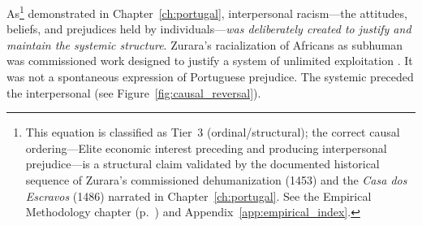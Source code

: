 As\footnote{This equation is classified as Tier~3 (ordinal/structural); the correct causal ordering---Elite economic interest preceding and producing interpersonal prejudice---is a structural claim validated by the documented historical sequence of Zurara's commissioned dehumanization (1453) and the \textit{Casa dos Escravos} (1486) narrated in Chapter~\ref{ch:portugal}. See the Empirical Methodology chapter (p.~\pageref{ch:empirical_methodology}) and Appendix~\ref{app:empirical_index}.} demonstrated in Chapter~\ref{ch:portugal}, interpersonal racism---the attitudes, beliefs, and prejudices held by individuals---\textit{was deliberately created to justify and maintain the systemic structure}. Zurara's racialization of Africans as subhuman was commissioned work designed to justify a system of unlimited exploitation \cite{zurara, biewen}. It was not a spontaneous expression of Portuguese prejudice. The systemic preceded the interpersonal (see Figure~\ref{fig:causal_reversal}).

